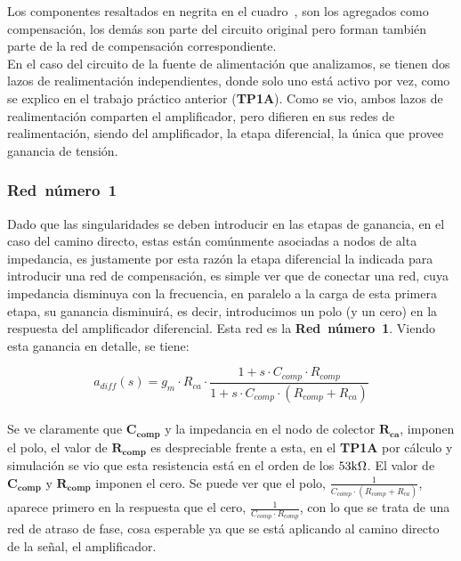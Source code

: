 



Los componentes resaltados en negrita en el cuadro~, son los agregados como compensación, los demás son parte del circuito original pero forman también parte de la red de compensación correspondiente.\\


En el caso del circuito de la fuente de alimentación que analizamos, se tienen dos lazos de realimentación independientes, donde solo uno está activo por vez, como se explico en el trabajo práctico anterior (\textbf{TP1A}). Como se vio, ambos lazos  de realimentación comparten el amplificador, pero difieren en sus redes de realimentación, siendo del amplificador, la etapa diferencial, la única que provee ganancia de tensión.\\


\subsubsection{\textbf{Red~número~1}}

Dado que las singularidades se deben introducir en las etapas de ganancia, en el caso del camino directo, estas están comúnmente asociadas a nodos de alta impedancia, es justamente por esta razón la etapa diferencial la indicada para introducir una red de compensación, es simple ver que de conectar una red, cuya impedancia disminuya con la frecuencia, en paralelo a la carga de esta primera etapa, su ganancia disminuirá, es decir, introducimos un polo (y un cero) en la respuesta del amplificador diferencial. Esta red es la \textbf{Red~número~1}. Viendo esta ganancia en detalle, se tiene:

\begin{equation}
a_{diff}\left(s\right) = g_m \cdot R_{ca} \cdot \frac{1+ s \cdot C_{comp} \cdot R_{comp}}{ 1 + s \cdot C_{comp} \cdot \left( R_{comp} + R_{ca} \right) }
\end{equation}\\

Se ve claramente que  $\bm{C_{comp}}$ y la impedancia en el nodo de colector $\bm{R_{ca}}$, imponen el polo, el valor de $\bm{R_{comp}}$ es despreciable frente a esta, en el \textbf{TP1A} por cálculo y simulación se vio que esta resistencia está en el orden de los $53 \si[per-mode=symbol]{\kilo\ohm}$. El valor de $\bm{C_{comp}}$ y $\bm{R_{comp}}$ imponen el cero. Se puede ver que el polo, $\frac{1}{ C_{comp} \cdot \left( R_{comp}+R_{ca} \right) }$, aparece primero en la respuesta que el cero, $ \frac{1}{C_{comp} \cdot R_{comp}}$, con lo que se trata de una red de atraso de fase, cosa esperable ya que se está aplicando al camino directo de la señal, el amplificador.\\

